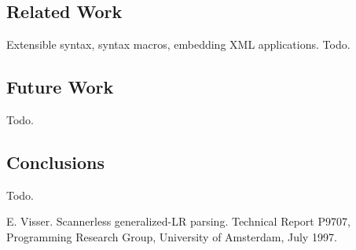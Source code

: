 \documentclass[a4paper,11pt]{article}
\begin{document}
\subsection{Related Work}

Extensible syntax, syntax macros, embedding XML applications.
Todo.


\subsection{Future Work}

Todo.


\subsection{Conclusions}

Todo.


\begin{thebibliography}{99}

E. Visser. Scannerless generalized-LR parsing.
Technical Report P9707, Programming Research Group, University of Amsterdam, July 1997.

\end{thebibliography}
\end{document}
